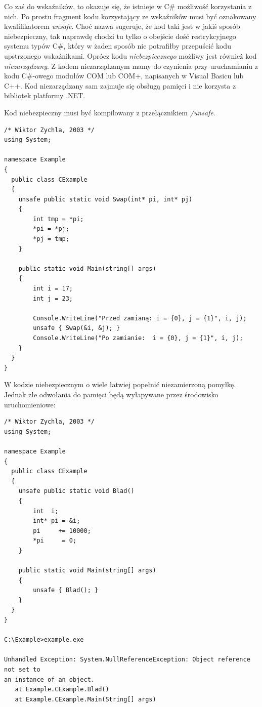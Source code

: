 Co zaś do wskaźników, to okazuje się, że istnieje w C\# możliwość korzystania z nich. Po prostu fragment kodu
korzystający ze wskaźników musi być oznakowany kwalifikatorem {\em unsafe}. Choć nazwa sugeruje, że kod
taki jest w jakiś sposób niebezpieczny, tak naprawdę chodzi tu tylko o obejście dość restrykcyjnego
systemu typów C\#, który w żaden sposób nie potrafiłby przepuścić kodu upstrzonego wskaźnikami. Oprócz kodu
{\em niebezpiecznego} możliwy jest również kod {\em niezarządzany}. Z kodem niezarządzanym mamy do czynienia
przy uruchamianiu z kodu C\#-owego modułów COM lub COM+, napisanych w Visual Basicu lub C++. Kod
niezarządzany sam zajmuje się obsługą pamięci i nie korzysta z bibliotek platformy .NET.

Kod niebezpieczny musi być kompilowany z przełącznikiem {\em /unsafe}.

\begin{scriptsize}
\begin{verbatim}
/* Wiktor Zychla, 2003 */
using System;

namespace Example
{
  public class CExample
  {
    unsafe public static void Swap(int* pi, int* pj)
    {
        int tmp = *pi;
        *pi = *pj;
        *pj = tmp;
    }

    public static void Main(string[] args)
    {
        int i = 17;
        int j = 23;

        Console.WriteLine("Przed zamianą: i = {0}, j = {1}", i, j);
        unsafe { Swap(&i, &j); }
        Console.WriteLine("Po zamianie:  i = {0}, j = {1}", i, j);
    }
  }
}
\end{verbatim}
\end{scriptsize}

W kodzie niebezpiecznym o wiele łatwiej popełnić niezamierzoną pomyłkę. Jednak złe odwołania 
do pamięci będą wyłapywane przez środowisko uruchomieniowe:

\begin{scriptsize}
\begin{verbatim}
/* Wiktor Zychla, 2003 */
using System;

namespace Example
{
  public class CExample
  {
    unsafe public static void Blad()
    {
        int  i;
        int* pi = &i;
        pi     += 10000;
        *pi     = 0;
    }

    public static void Main(string[] args)
    {
        unsafe { Blad(); }
    }
  }
}

C:\Example>example.exe

Unhandled Exception: System.NullReferenceException: Object reference not set to
an instance of an object.
   at Example.CExample.Blad()
   at Example.CExample.Main(String[] args)
\end{verbatim}
\end{scriptsize}

